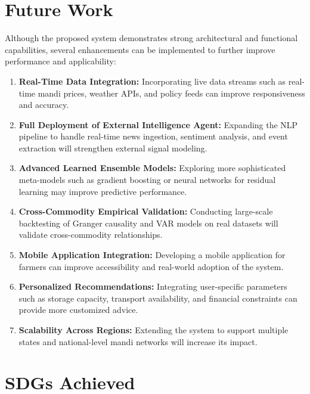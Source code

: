 \documentclass[12pt,a4paper]{report}
\begin{document}
\section{Future Work}

Although the proposed system demonstrates strong architectural and functional capabilities, several enhancements can be implemented to further improve performance and applicability:

\begin{enumerate}
    \item \textbf{Real-Time Data Integration:}  
    Incorporating live data streams such as real-time mandi prices, weather APIs, and policy feeds can improve responsiveness and accuracy.

    \item \textbf{Full Deployment of External Intelligence Agent:}  
    Expanding the NLP pipeline to handle real-time news ingestion, sentiment analysis, and event extraction will strengthen external signal modeling.

    \item \textbf{Advanced Learned Ensemble Models:}  
    Exploring more sophisticated meta-models such as gradient boosting or neural networks for residual learning may improve predictive performance.

    \item \textbf{Cross-Commodity Empirical Validation:}  
    Conducting large-scale backtesting of Granger causality and VAR models on real datasets will validate cross-commodity relationships.

    \item \textbf{Mobile Application Integration:}  
    Developing a mobile application for farmers can improve accessibility and real-world adoption of the system.

    \item \textbf{Personalized Recommendations:}  
    Integrating user-specific parameters such as storage capacity, transport availability, and financial constraints can provide more customized advice.

    \item \textbf{Scalability Across Regions:}  
    Extending the system to support multiple states and national-level mandi networks will increase its impact.

\end{enumerate}

\section{SDGs Achieved}
\end{document}
